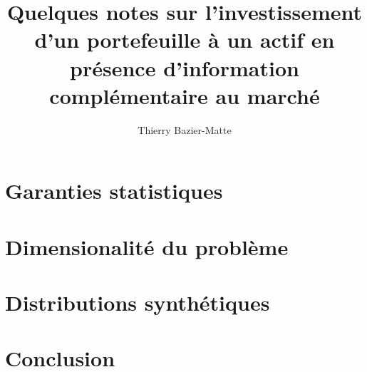 \documentclass{article}
\title{Quelques notes sur l'investissement d'un portefeuille à un actif en présence
  d'information complémentaire au marché}
\author{Thierry Bazier-Matte}
\begin{document}
\maketitle
\tableofcontents

\newpage

\newpage

\newpage


\newpage
\section{Garanties statistiques}

\section{Dimensionalité du problème}

\section{Distributions synthétiques}

\section{Conclusion}

\newpage
\end{document}
